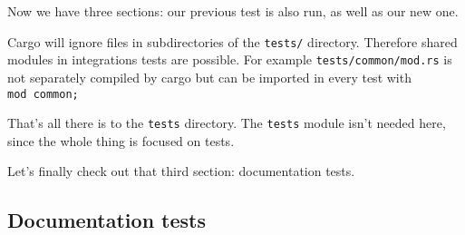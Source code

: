 \documentclass[a4paper,]{book}
\newenvironment{Shaded}{\begin{snugshade}}{\end{snugshade}}
\newcommand{\KeywordTok}[1]{\textcolor[rgb]{0.13,0.29,0.53}{\textbf{{#1}}}}
\newcommand{\NormalTok}[1]{{#1}}
\begin{document}
\begin{Shaded}
\end{Shaded}

Now we have three sections: our previous test is also run, as well as
our new one.

Cargo will ignore files in subdirectories of the \texttt{tests/}
directory. Therefore shared modules in integrations tests are possible.
For example \texttt{tests/common/mod.rs} is not separately compiled by
cargo but can be imported in every test with \texttt{mod\ common;}

That's all there is to the \texttt{tests} directory. The \texttt{tests}
module isn't needed here, since the whole thing is focused on tests.

Let's finally check out that third section: documentation tests.

\subsection{Documentation tests}\label{documentation-tests}
\end{document}
